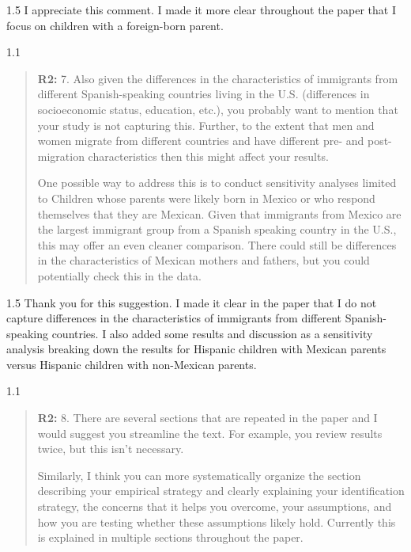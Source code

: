 \documentclass[12pt,english]{article}
\newcommand{\rrquote}{1.1}
\newcommand{\rrxspc}{1.5}
\begin{document}
\begin{refsection}
        \begin{spacing}{\rrxspc}
            I appreciate this comment. I made it more clear throughout the paper that I focus on children with a foreign-born parent. 
    \end{spacing}

    \begin{spacing}{\rrquote}
        \begin{quotation}
        \textbf{R2: } 7. Also given the differences in the characteristics of immigrants from different Spanish-speaking countries living in the U.S. (differences in socioeconomic status, education, etc.), you probably want to mention that your study is not capturing this. Further, to the extent that men and women migrate from different countries and have different pre- and post-migration characteristics then this might affect your results.

        One possible way to address this is to conduct sensitivity analyses limited to Children whose parents were likely born in Mexico or who respond themselves that they are Mexican. Given that immigrants from Mexico are the largest immigrant group from a Spanish speaking country in the U.S., this may offer an even cleaner comparison. There could still be differences in the characteristics of Mexican mothers and fathers, but you could potentially check this in the data.        
        \end{quotation}
        \end{spacing}
        
        \begin{spacing}{\rrxspc}
            Thank you for this suggestion. I made it clear in the paper that I do not capture differences in the characteristics of immigrants from different Spanish-speaking countries. I also added some results and discussion as a sensitivity analysis breaking down the results for Hispanic children with Mexican parents versus Hispanic children with non-Mexican parents. 
    \end{spacing}

    \begin{spacing}{\rrquote}
        \begin{quotation}
        \textbf{R2: } 8. There are several sections that are repeated in the paper and I would suggest you streamline the text. For example, you review results twice, but this isn’t necessary.

        Similarly, I think you can more systematically organize the section describing your empirical strategy and clearly explaining your identification strategy, the concerns that it helps you overcome, your assumptions, and how you are testing whether these assumptions likely hold. Currently this is explained in multiple sections throughout the paper.        
        \end{quotation}
        \end{spacing}
        

\end{refsection}
\end{document}
